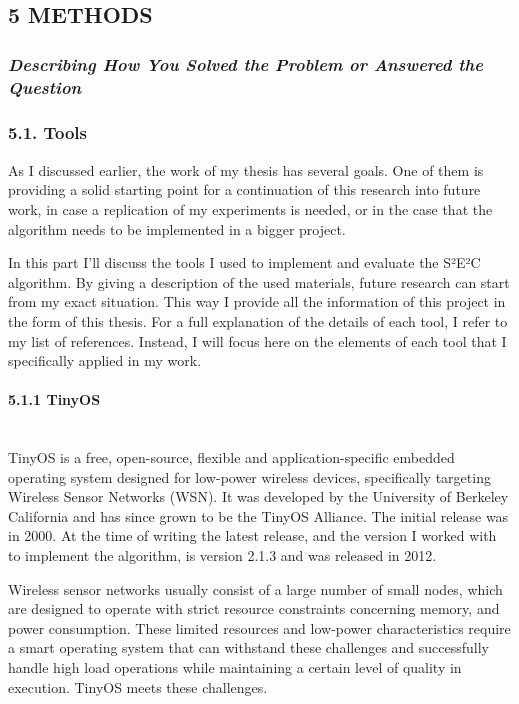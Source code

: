 \subsection{5 METHODS}\label{methods}

\subsubsection{\emph{Describing How You Solved the Problem or Answered
the
Question}}\label{describing-how-you-solved-the-problem-or-answered-the-question}

\subsubsection{5.1. Tools}\label{tools}

As I discussed earlier, the work of my thesis has several goals. One of
them is providing a solid starting point for a continuation of this
research into future work, in case a replication of my experiments is
needed, or in the case that the algorithm needs to be implemented in a
bigger project.

In this part I'll discuss the tools I used to implement and evaluate the
S²E²C algorithm. By giving a description of the used materials, future
research can start from my exact situation. This way I provide all the
information of this project in the form of this thesis. For a full
explanation of the details of each tool, I refer to my list of
references. Instead, I will focus here on the elements of each tool that
I specifically applied in my work.

\paragraph{5.1.1 TinyOS\\\\}\label{tinyos}

TinyOS is a free, open-source, flexible and application-specific
embedded operating system designed for low-power wireless devices,
specifically targeting Wireless Sensor Networks (WSN). It was developed
by the University of Berkeley California and has since grown to be the
TinyOS Alliance. The initial release was in 2000. At the time of writing
the latest release, and the version I worked with to implement the
algorithm, is version 2.1.3 and was released in 2012.

Wireless sensor networks usually consist of a large number of small
nodes, which are designed to operate with strict resource constraints
concerning memory, and power consumption. These limited resources and
low-power characteristics require a smart operating system that can
withstand these challenges and successfully handle high load operations
while maintaining a certain level of quality in execution. TinyOS meets
these challenges.

